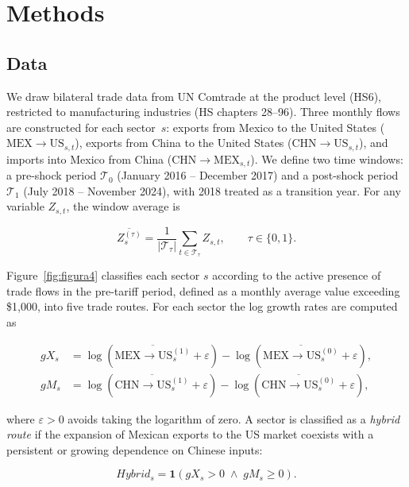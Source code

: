 \documentclass[11pt]{article}
\begin{document}
\section{Methods}
\subsection{Data}

We draw bilateral trade data from UN Comtrade
at the product level (HS6), restricted to manufacturing industries
(HS chapters 28--96). Three monthly flows are constructed for each sector~$s$:
exports from Mexico to the United States ($\text{MEX}{\to}\text{US}_{s,t}$),
exports from China to the United States ($\text{CHN}{\to}\text{US}_{s,t}$),
and imports into Mexico from China ($\text{CHN}{\to}\text{MEX}_{s,t}$).
We define two time windows: a pre-shock period
$\mathcal{T}_{0}$ (January 2016 -- December 2017) and a post-shock period
$\mathcal{T}_{1}$ (July 2018 -- November 2024), with 2018 treated as a
transition year. For any variable $Z_{s,t}$, the window average is

\begin{equation}
\overline{Z_{s}^{(\tau)}} =
\frac{1}{\left|\mathcal{T}_{\tau}\right|}
\sum_{t \in \mathcal{T}_{\tau}} Z_{s,t}, \qquad \tau \in \{0,1\}.
\end{equation}

Figure~\ref{fig:figura4} classifies each sector $s$ according to the
active presence of trade flows in the pre-tariff period, defined as a
monthly average value exceeding \$1{,}000, into five trade routes.
For each sector the log growth rates are computed as

\begin{align}
gX_{s} &= \log\!\left(\overline{\text{MEX}{\to}\text{US}_{s}^{(1)}}
+ \varepsilon\right)
- \log\!\left(\overline{\text{MEX}{\to}\text{US}_{s}^{(0)}}
+ \varepsilon\right), \\
gM_{s} &= \log\!\left(\overline{\text{CHN}{\to}\text{US}_{s}^{(1)}}
+ \varepsilon\right)
- \log\!\left(\overline{\text{CHN}{\to}\text{US}_{s}^{(0)}}
+ \varepsilon\right),
\end{align}

where $\varepsilon > 0$ avoids taking the logarithm of zero. A sector is
classified as a \textit{hybrid route} if the expansion of Mexican exports
to the US market coexists with a persistent or growing dependence on
Chinese inputs:

\begin{equation}
Hybrid_{s} = \mathbf{1}\!\left(gX_{s} > 0 \;\land\; gM_{s} \geq 0\right).
\end{equation}
\end{document}

